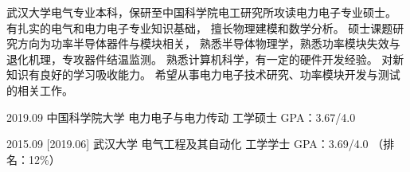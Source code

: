 \documentclass[zh]{resume}
\begin{document}
\makeheader

{\onehalfspacing\hspace{2em}%
武汉大学电气专业本科，保研至中国科学院电工研究所攻读电力电子专业硕士。
有扎实的电气和电力电子专业知识基础，
擅长物理建模和数学分析。
硕士课题研究方向为功率半导体器件与模块相关，
熟悉半导体物理学，熟悉功率模块失效与退化机理，专攻器件结温监测。
熟悉计算机科学，有一定的硬件开发经验。
对新知识有良好的学习吸收能力。
希望从事电力电子技术研究、功率模块开发与测试的相关工作。
\par}

\begin{educations}
  \education%
    {2019.09}%
    {中国科学院大学}%
    {电力电子与电力传动}%
    {工学硕士}%
    {GPA：3.67/4.0}
    

  \separator{0.1ex}
  \education%
    {2015.09}%
    [2019.06]%
    {武汉大学}%
    {电气工程及其自动化}%
    {工学学士}%
    {GPA：3.69/4.0 （排名：12\%）}
\end{educations}

\begin{competences}

    
\end{competences}
\end{document}
